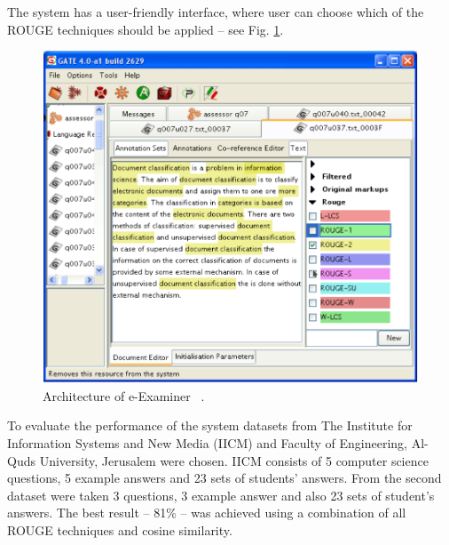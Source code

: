 \documentclass[11pt]{report}
\numberwithin{equation}{section} %
\begin{document}
The system has a user-friendly interface, where user can choose which of the ROUGE techniques should be applied -- see Fig. \ref{fig:e-examiner_Interface}.\\

\begin{figure}[h!]
  \centering
  \includegraphics[width=\textwidth]{img/e-examiner_Interface}
    \caption{ Architecture of e-Examiner ~\cite{e-examiner}. }\label{fig:e-examiner_Interface}
\end{figure}

To evaluate the performance of the system datasets from The Institute for Information Systems and New Media (IICM) and Faculty of Engineering, Al-Quds University, Jerusalem were chosen. IICM consists of 5 computer science questions, 5 example answers and 23 sets of students' answers. From the second dataset were taken 3 questions, 3 example answer and also 23 sets of student's answers. The best result -- 81\% -- was achieved using a combination of all ROUGE techniques and cosine similarity.\\
\end{document}
